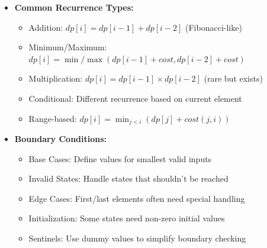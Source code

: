 \documentclass[a4paper,10pt]{book}
\begin{document}
\begin{itemize}[leftmargin=*]
    \item \textbf{Common Recurrence Types:}
    \begin{itemize}
        \item Addition: $dp[i] = dp[i-1] + dp[i-2]$ (Fibonacci-like)
        \item Minimum/Maximum: $dp[i] = \min/\max(dp[i-1] + cost, dp[i-2] + cost)$
        \item Multiplication: $dp[i] = dp[i-1] \times dp[i-2]$ (rare but exists)
        \item Conditional: Different recurrence based on current element
        \item Range-based: $dp[i] = \min_{j < i}(dp[j] + cost(j,i))$
    \end{itemize}

    \item \textbf{Boundary Conditions:}
    \begin{itemize}
        \item Base Cases: Define values for smallest valid inputs
        \item Invalid States: Handle states that shouldn't be reached
        \item Edge Cases: First/last elements often need special handling
        \item Initialization: Some states need non-zero initial values
        \item Sentinels: Use dummy values to simplify boundary checking
    \end{itemize}
\end{itemize}
\end{document}
